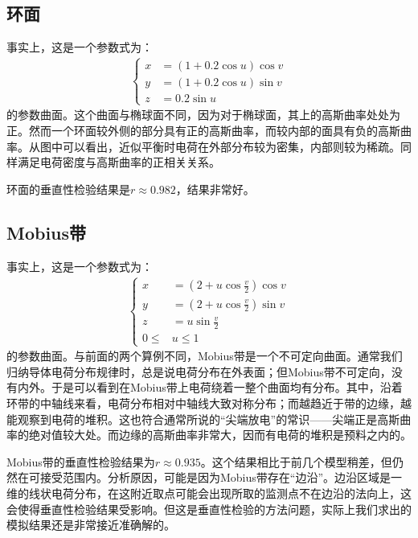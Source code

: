 \documentclass[UTF8]{article}
\numberwithin{figure}{subsection}
\numberwithin{table}{subsection}
\begin{document}
\begin{multicols}{2}
        \subsection{环面}
        
        
        事实上，这是一个参数式为：
        \begin{align}
            \left\{
            \begin{aligned}
                x&=(1+0.2\cos u)\cos v \\
                y&=(1+0.2\cos u)\sin v  \\
                z&=0.2\sin u
            \end{aligned}   
            \right.
        \end{align}
        的参数曲面。这个曲面与椭球面不同，因为对于椭球面，其上的高斯曲率处处为正。然而一个环面较外侧的部分具有正的高斯曲率，而较内部的面具有负的高斯曲率。从图中可以看出，近似平衡时电荷在外部分布较为密集，内部则较为稀疏。同样满足电荷密度与高斯曲率的正相关关系。
        \par 环面的垂直性检验结果是$r\approx 0.982$，结果非常好。
        \subsection{Mobius带}
        
        
    
        事实上，这是一个参数式为：
        \begin{align}
            \left\{
            \begin{aligned}
                x&=(2+u\cos \frac v2)\cos v \\
                y&=(2+u\cos \frac v2)\sin v  \\
                z&=u\sin \frac v2\\
                0\leq&u\leq 1
            \end{aligned}   
            \right.
        \end{align}
        的参数曲面。与前面的两个算例不同，Mobius带是一个不可定向曲面。通常我们归纳导体电荷分布规律时，总是说电荷分布在外表面；但Mobius带不可定向，没有内外。于是可以看到在Mobius带上电荷绕着一整个曲面均有分布。其中，沿着环带的中轴线来看，电荷分布相对中轴线大致对称分布；而越趋近于带的边缘，越能观察到电荷的堆积。这也符合通常所说的“尖端放电”的常识——尖端正是高斯曲率的绝对值较大处。而边缘的高斯曲率非常大，因而有电荷的堆积是预料之内的。
        \par Mobius带的垂直性检验结果为$r\approx 0.935$。这个结果相比于前几个模型稍差，但仍然在可接受范围内。分析原因，可能是因为Mobius带存在“边沿”。边沿区域是一维的线状电荷分布，在这附近取点可能会出现所取的监测点不在边沿的法向上，这会使得垂直性检验结果受影响。但这是垂直性检验的方法问题，实际上我们求出的模拟结果还是非常接近准确解的。
    

\end{multicols}
\end{document}
